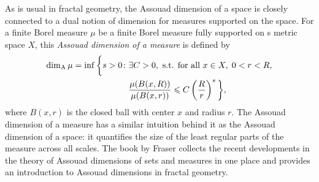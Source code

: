 \documentclass{PRM}
\newcommand{\adim}{\dim_{\mathrm{A}}}
\theoremstyle{plain}
\theoremstyle{definition}
\theoremstyle{remark}
\begin{document}
As is usual in fractal geometry, the Assouad dimension of a space is closely connected to a dual notion of dimension for measures supported on the space. For a finite Borel measure $\mu$  be a finite Borel measure fully supported on s metric space $X$, this \emph{Assouad dimension of a measure} is defined by
\begin{align*}
    \adim \mu=\inf\bigg\{ s>0\colon& \exists C>0,\textnormal{ s.t. for all }x\in X,\; 0<r<R,\\
    &\frac{\mu(B(x,R))}{\mu(B(x,r))}\leq C\left(\frac{R}{r}\right)^s\bigg\},
\end{align*}
where $B(x,r)$ is the closed ball with center $x$ and radius $r$. The Assouad dimension of a measure has a similar intuition behind it as the Assouad dimension of a space: it quantifies the size of the least regular parts of the measure across all scales. The book by Fraser \cite{F} collects the recent developments in the theory of Assouad dimensions of sets and measures in one place and provides an introduction to Assouad dimensions in fractal geometry.
\end{document}
